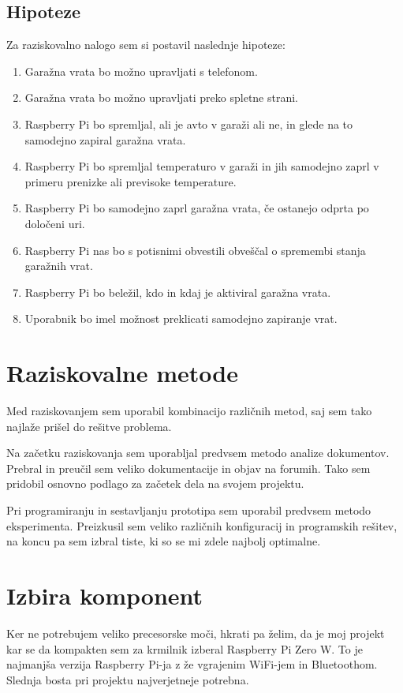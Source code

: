 \documentclass[11pt]{article}
\begin{document}
\subsection{Hipoteze}
Za raziskovalno nalogo sem si postavil naslednje hipoteze:
\begin{enumerate}
    \item Garažna vrata bo možno upravljati s telefonom.
    \item Garažna vrata bo možno upravljati preko spletne strani.
    \item Raspberry Pi bo spremljal, ali je avto v garaži ali ne, in glede na to samodejno zapiral garažna vrata.
    \item Raspberry Pi bo spremljal temperaturo v garaži in jih samodejno zaprl v primeru prenizke ali previsoke temperature.
    \item Raspberry Pi bo samodejno zaprl garažna vrata, če ostanejo odprta po določeni uri.
    \item Raspberry Pi nas bo s potisnimi obvestili obveščal o spremembi stanja garažnih vrat.
    \item Raspberry Pi bo beležil, kdo in kdaj je aktiviral garažna vrata.
    \item Uporabnik bo imel možnost preklicati samodejno zapiranje vrat.
\end{enumerate}

\section{Raziskovalne metode}
Med raziskovanjem sem uporabil kombinacijo različnih metod, saj sem tako najlaže prišel do rešitve problema.

Na začetku raziskovanja sem uporabljal predvsem metodo analize dokumentov. Prebral in preučil sem veliko dokumentacije in objav na forumih. Tako sem pridobil osnovno podlago za začetek dela na svojem projektu.

Pri programiranju in sestavljanju prototipa sem uporabil predvsem metodo eksperimenta. Preizkusil sem veliko različnih konfiguracij in programskih rešitev, na koncu pa sem izbral tiste, ki so se mi zdele najbolj optimalne.
\newpage

\section{Izbira komponent}
  Ker ne potrebujem veliko precesorske moči, hkrati pa želim, da je moj projekt kar se da kompakten sem za krmilnik izberal Raspberry Pi Zero W. To je najmanjša verzija Raspberry Pi-ja z že vgrajenim WiFi-jem in Bluetoothom. Slednja bosta pri projektu najverjetneje potrebna.
\end{document}
